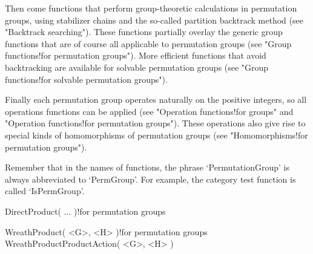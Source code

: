 Then  come functions that     perform  group-theoretic calculations    in
permutation groups, using  stabilizer chains and  the so-called partition
backtrack  method (see "Backtrack  searching"). These functions partially
overlay the generic group functions that  are of course all applicable to
permutation groups (see "Group  functions!for permutation  groups"). More
efficient functions that   avoid backtracking are available for  solvable
permutation groups (see   "Group   functions!for   solvable   permutation
groups").

Finally  each permutation    group  operates naturally    on the positive
integers,  so all  operations  functions can  be applied (see  "Operation
functions!for  groups" and "Operation functions!for permutation groups").
These operations  also give  rise to  special kinds  of  homomorphisms of
permutation groups (see "Homomorphisms!for permutation groups").

Remember that     in   the  names   of  {\GAP}    functions,  the  phrase
`PermutationGroup' is always abbreviated to `PermGroup'. For example, the
category test function is called `IsPermGroup'.


\>DirectProduct( ... )!{for permutation groups}

\>WreathProduct( <G>, <H> )!{for permutation groups}
\>WreathProductProductAction( <G>, <H> )

